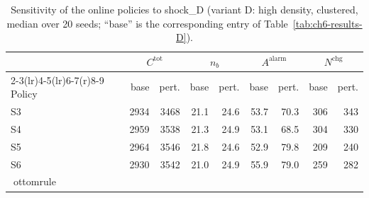 \begin{table}[htbp]
\centering
\caption{Sensitivity of the online policies to shock_D (variant D: high density, clustered,
median over 20 seeds; ``base'' is the corresponding entry of
Table~\ref{tab:ch6-results-D}).}
\label{tab:ch6-sens-D-shock}
\footnotesize
\begin{tabular}{@{}l rr rr rr rr@{}}
\toprule
& \multicolumn{2}{c}{$C^{\mathrm{tot}}$} & \multicolumn{2}{c}{$n_b$}
  & \multicolumn{2}{c}{$A^{\mathrm{alarm}}$} & \multicolumn{2}{c}{$N^{\mathrm{chg}}$} \\
\cmidrule(r){2-3}\cmidrule(lr){4-5}\cmidrule(lr){6-7}\cmidrule(r){8-9}
Policy & base & pert. & base & pert. & base & pert. & base & pert. \\
\midrule

S3 & 2934 & 3468 & 21.1 & 24.6 & 53.7 & 70.3 & 306 & 343 \\
S4 & 2959 & 3538 & 21.3 & 24.9 & 53.1 & 68.5 & 304 & 330 \\
S5 & 2964 & 3546 & 21.8 & 24.6 & 52.9 & 79.8 & 209 & 240 \\
S6 & 2930 & 3542 & 21.0 & 24.9 & 55.9 & 79.0 & 259 & 282 \\
ottomrule
\end{tabular}
\end{table}
